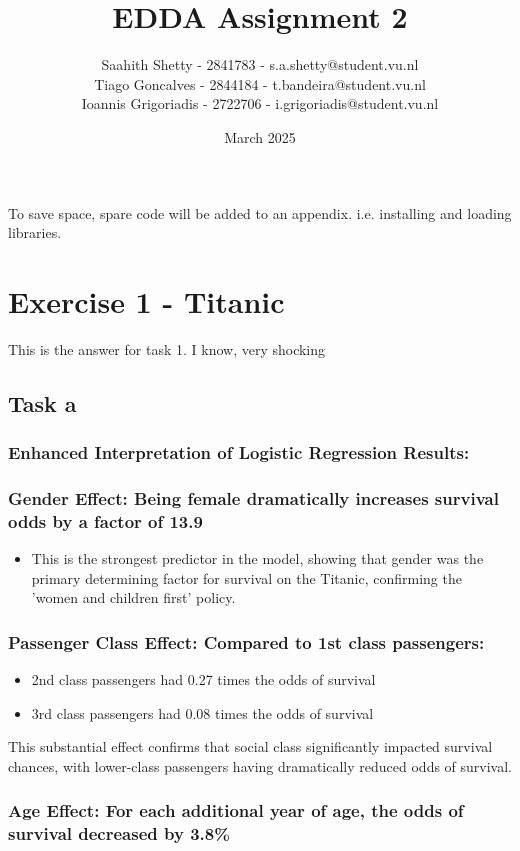 \documentclass{article}
\title{EDDA Assignment 2}
\author{Saahith Shetty - 2841783 - s.a.shetty@student.vu.nl \\ 
Tiago Goncalves -  2844184 - t.bandeira@student.vu.nl \\
Ioannis Grigoriadis -  2722706 - i.grigoriadis@student.vu.nl}
\date{March 2025}
\begin{document}
\maketitle
To save space, spare code will be added to an appendix. i.e. installing and loading libraries. 

\section{Exercise 1 - Titanic}
This is the answer for task 1. I know, very shocking 

\subsection{Task a}

\subsubsection{Enhanced Interpretation of Logistic Regression Results:}
\subsubsection{Gender Effect: Being female dramatically increases survival odds by a factor of 13.9 }
\begin{itemize}
    \item This is the strongest predictor in the model, showing that gender was the primary
   determining factor for survival on the Titanic, confirming the 'women and children first' policy.
\end{itemize}

\subsubsection{Passenger Class Effect: Compared to 1st class passengers:}
\begin{itemize}
    \item 2nd class passengers had 0.27 times the odds of survival
    \item 3rd class passengers had 0.08 times the odds of survival
\end{itemize}
This substantial effect confirms that social class significantly impacted survival chances, with lower-class passengers having dramatically reduced odds of survival.

\subsubsection{Age Effect: For each additional year of age, the odds of survival decreased by 3.8\%} 
\end{document}
